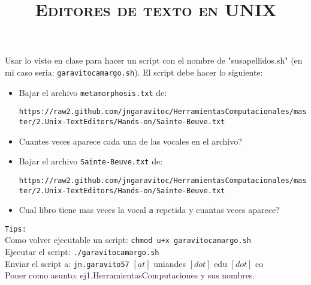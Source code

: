 \documentclass[12pt]{article}
\title{\textsc{Editores de texto en UNIX}}
\begin{document}
\date{}
\maketitle


Usar lo visto en clase para hacer un script con el nombre de "susapellidos.sh" (en mi caso seria: \texttt{garavitocamargo.sh}).
El script debe hacer lo siguiente:\\

\begin{itemize}

\item Bajar el archivo \texttt{metamorphosis.txt} de:\\
\begin{scriptsize}
\verb"https://raw2.github.com/jngaravitoc/HerramientasComputacionales/master/2.Unix-TextEditors/Hands-on/Sainte-Beuve.txt"
\end{scriptsize}  

\item Cuantes veces aparece cada una de las vocales en el archivo?

\item Bajar el archivo \texttt{Sainte-Beuve.txt} de: 

\begin{scriptsize}
\verb"https://raw2.github.com/jngaravitoc/HerramientasComputacionales/master/2.Unix-TextEditors/Hands-on/Sainte-Beuve.txt"
\end{scriptsize} 

\item Cual libro tiene mas veces la vocal \texttt{a} repetida y cuantas veces aparece?


\end{itemize}

\texttt{Tips:}\\

Como volver ejecutable un script: \texttt{chmod u+x garavitocamargo.sh}\\

Ejecutar el script: \texttt{./garavitocamargo.sh}\\

Enviar el script a: \texttt{jn.garavito57} $[at]$ uniandes $[dot]$ edu $[dot]$ co  \\

Poner como asunto: ej1.HerramientasComputaciones y sus nombres.
\end{document}
